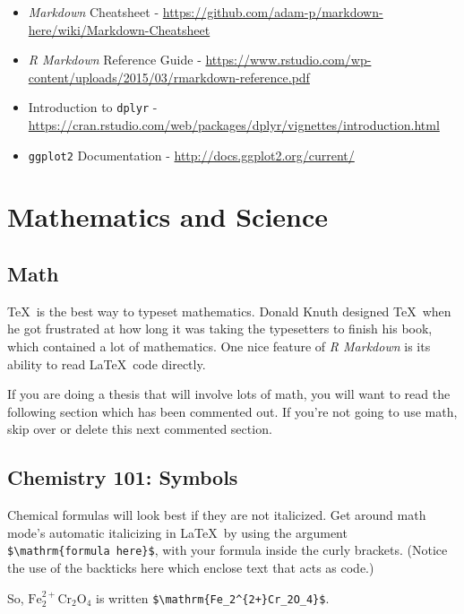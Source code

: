 \documentclass[12pt,twoside]{reedthesis}
\begin{document}
  \begin{itemize}
  \item
    \emph{Markdown} Cheatsheet -
    \url{https://github.com/adam-p/markdown-here/wiki/Markdown-Cheatsheet}
  \item
    \emph{R Markdown} Reference Guide -
    \url{https://www.rstudio.com/wp-content/uploads/2015/03/rmarkdown-reference.pdf}
  \item
    Introduction to \texttt{dplyr} -
    \url{https://cran.rstudio.com/web/packages/dplyr/vignettes/introduction.html}
  \item
    \texttt{ggplot2} Documentation -
    \url{http://docs.ggplot2.org/current/}
  \end{itemize}
  
  \hypertarget{math-sci}{\chapter{Mathematics and
  Science}\label{math-sci}}
  
  \hypertarget{math}{\section{Math}\label{math}}
  
  \TeX~is the best way to typeset mathematics. Donald Knuth designed
  \TeX~when he got frustrated at how long it was taking the typesetters to
  finish his book, which contained a lot of mathematics. One nice feature
  of \emph{R Markdown} is its ability to read \LaTeX~code directly.
  
  If you are doing a thesis that will involve lots of math, you will want
  to read the following section which has been commented out. If you're
  not going to use math, skip over or delete this next commented section.
  
  \section{Chemistry 101: Symbols}\label{chemistry-101-symbols}
  
  Chemical formulas will look best if they are not italicized. Get around
  math mode's automatic italicizing in \LaTeX~by using the argument
  \texttt{\$\textbackslash{}mathrm\{formula\ here\}\$}, with your formula
  inside the curly brackets. (Notice the use of the backticks here which
  enclose text that acts as code.)
  
  So, \(\mathrm{Fe_2^{2+}Cr_2O_4}\) is written
  \texttt{\$\textbackslash{}mathrm\{Fe\_2\^{}\{2+\}Cr\_2O\_4\}\$}.
  
\end{document}
